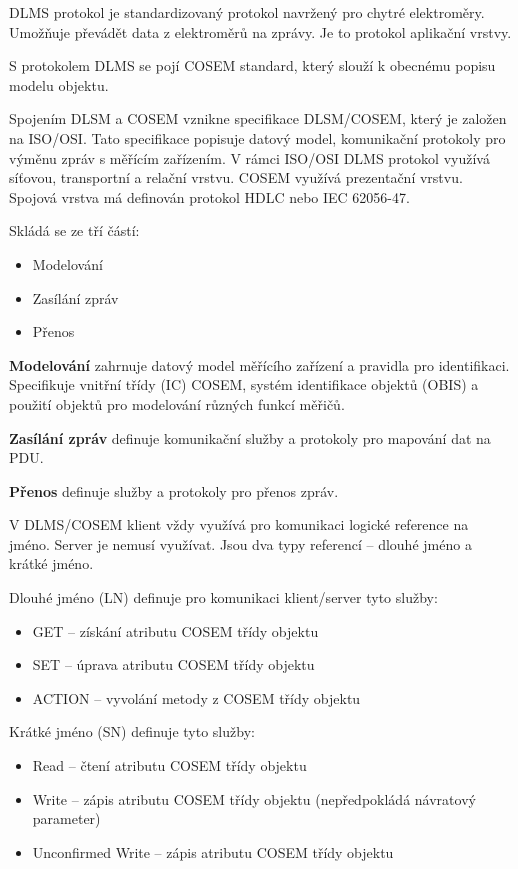 DLMS protokol je standardizovaný protokol navržený pro chytré elektroměry.
Umožňuje převádět data z elektroměrů na zprávy.
Je to protokol aplikační vrstvy.

S protokolem DLMS se pojí COSEM standard, který slouží k obecnému popisu modelu objektu.

Spojením DLSM a COSEM vznikne specifikace DLSM/COSEM, který je založen na ISO/OSI.
Tato specifikace popisuje datový model, komunikační protokoly pro výměnu zpráv s měřícím zařízením.
V rámci ISO/OSI DLMS protokol využívá síťovou, transportní a relační vrstvu.
COSEM využívá prezentační vrstvu.
Spojová vrstva má definován protokol HDLC nebo IEC 62056-47.

Skládá se ze tří částí:
\begin{itemize}
    \item Modelování
    \item Zasílání zpráv
    \item Přenos
\end{itemize}

\textbf{Modelování} zahrnuje datový model měřícího zařízení a pravidla pro identifikaci.
Specifikuje vnitřní třídy (IC) COSEM, systém identifikace objektů (OBIS) a použití objektů pro modelování různých funkcí měřičů.

\textbf{Zasílání zpráv} definuje komunikační služby a protokoly pro mapování dat na PDU.

\textbf{Přenos} definuje služby a protokoly pro přenos zpráv.

V DLMS/COSEM klient vždy využívá pro komunikaci logické reference na jméno.
Server je nemusí využívat.
Jsou dva typy referencí -- dlouhé jméno a krátké jméno.

Dlouhé jméno (LN) definuje pro komunikaci klient/server tyto služby:
\begin{itemize}
    \item GET -- získání atributu COSEM třídy objektu
    \item SET -- úprava atributu COSEM třídy objektu
    \item ACTION -- vyvolání metody z COSEM třídy objektu
\end{itemize}

Krátké jméno (SN) definuje tyto služby:
\begin{itemize}
    \item Read -- čtení atributu COSEM třídy objektu
    \item Write -- zápis atributu COSEM třídy objektu (nepředpokládá návratový parameter)
    \item Unconfirmed Write -- zápis atributu COSEM třídy objektu
\end{itemize}

